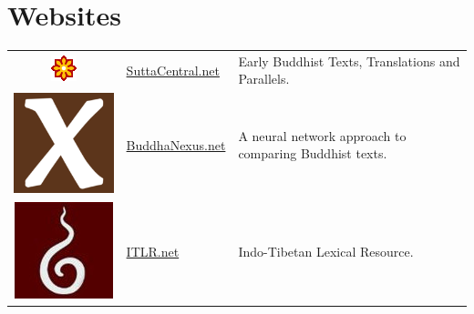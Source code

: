 \section*{Websites}

\begin{tabular}{ c l l }
 \includegraphics[width=0.05\linewidth]{sc_logo.png} & \href{https://suttacentral.net/}{SuttaCentral.net} & Early Buddhist Texts, Translations and Parallels. \\  
 \includegraphics[width=0.04\linewidth]{bn_logo.png} & \href{https://buddhanexus.net/}{BuddhaNexus.net} & A neural network approach to comparing Buddhist texts. \\
 \includegraphics[width=0.04\linewidth]{itlr.jpg} & \href{https://www.itlr.net/test.php?md=view}{ITLR.net} & Indo-Tibetan Lexical Resource. \\
\end{tabular}